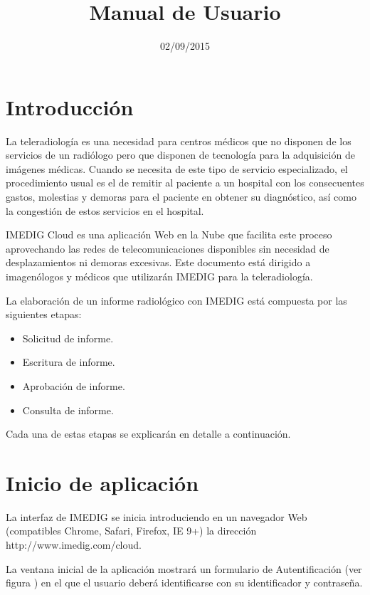 \documentclass{plantilla-manual-usuario}
\title{Manual de Usuario}
\date{02/09/2015}
\begin{document}
\frontmatter

\maketitle

\newpage

\tableofcontents

\mainmatter
\clearpage

\section{Introducción}

La teleradiología es una necesidad para centros médicos que no disponen de los servicios de un radiólogo pero que disponen de tecnología para la adquisición de imágenes médicas. Cuando se necesita de este tipo de servicio especializado, el procedimiento usual es el de remitir al paciente a un hospital con los consecuentes gastos, molestias y demoras para el paciente en obtener su diagnóstico, así como la congestión de estos servicios en el hospital.

IMEDIG Cloud es una aplicación Web en la Nube que facilita este proceso aprovechando las redes de telecomunicaciones disponibles sin necesidad de desplazamientos ni demoras excesivas. Este documento está dirigido a imagenólogos y médicos que utilizarán IMEDIG para la teleradiología.

La elaboración de un informe radiológico con IMEDIG está compuesta por las siguientes etapas: 

\begin{itemize}
\item Solicitud de informe.
\item Escritura de informe.
\item Aprobación de informe.
\item Consulta de informe.
\end{itemize}

Cada una de estas etapas se explicarán en detalle a continuación. 


\section{Inicio de aplicación}

La interfaz de IMEDIG se inicia introduciendo en un navegador Web (compatibles Chrome, Safari, Firefox, IE 9+) la dirección http://www.imedig.com/cloud.

La ventana inicial de la aplicación mostrará un formulario de Autentificación (ver figura ) en el que el usuario deberá identificarse con su identificador y contraseña. 
\end{document}
